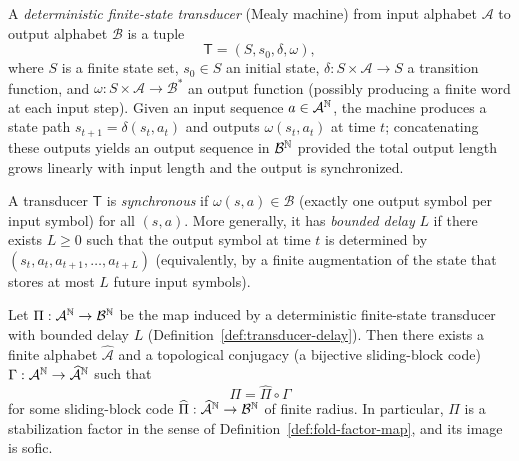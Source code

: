 \begin{definition}\label{def:det-transducer}
A \emph{deterministic finite-state transducer} (Mealy machine) from input alphabet $\mathcal{A}$ to output alphabet $\mathcal{B}$ is a tuple
\[
\mathsf{T}=(S,s_0,\delta,\omega),
\]
where $S$ is a finite state set, $s_0\in S$ an initial state, $\delta:S\times\mathcal{A}\to S$ a transition function, and $\omega:S\times\mathcal{A}\to \mathcal{B}^\ast$ an output function (possibly producing a finite word at each input step).
Given an input sequence $a\in\mathcal{A}^{\mathbb{N}}$, the machine produces a state path $s_{t+1}=\delta(s_t,a_t)$ and outputs $\omega(s_t,a_t)$ at time $t$; concatenating these outputs yields an output sequence in $\mathcal{B}^{\mathbb{N}}$ provided the total output length grows linearly with input length and the output is synchronized.
\cite{AlloucheShallit2003AutomaticSequences}
\end{definition}

\begin{definition}\label{def:transducer-delay}
A transducer $\mathsf{T}$ is \emph{synchronous} if $\omega(s,a)\in\mathcal{B}$ (exactly one output symbol per input symbol) for all $(s,a)$.
More generally, it has \emph{bounded delay} $L$ if there exists $L\ge 0$ such that the output symbol at time $t$ is determined by $(s_t,a_t,a_{t+1},\dots,a_{t+L})$ (equivalently, by a finite augmentation of the state that stores at most $L$ future input symbols).
\end{definition}

\begin{proposition}\label{prop:transducer-to-slidingblock}
Let $\Pi:\mathcal{A}^{\mathbb{N}}\to\mathcal{B}^{\mathbb{N}}$ be the map induced by a deterministic finite-state transducer with bounded delay $L$ (Definition~\ref{def:transducer-delay}). Then there exists a finite alphabet $\widehat{\mathcal{A}}$ and a topological conjugacy (a bijective sliding-block code) $\Gamma:\mathcal{A}^{\mathbb{N}}\to \widehat{\mathcal{A}}^{\mathbb{N}}$ such that
\[
\Pi=\widehat{\Pi}\circ \Gamma
\]
for some sliding-block code $\widehat{\Pi}:\widehat{\mathcal{A}}^{\mathbb{N}}\to\mathcal{B}^{\mathbb{N}}$ of finite radius.
In particular, $\Pi$ is a stabilization factor in the sense of Definition~\ref{def:fold-factor-map}, and its image is sofic.
\end{proposition}


